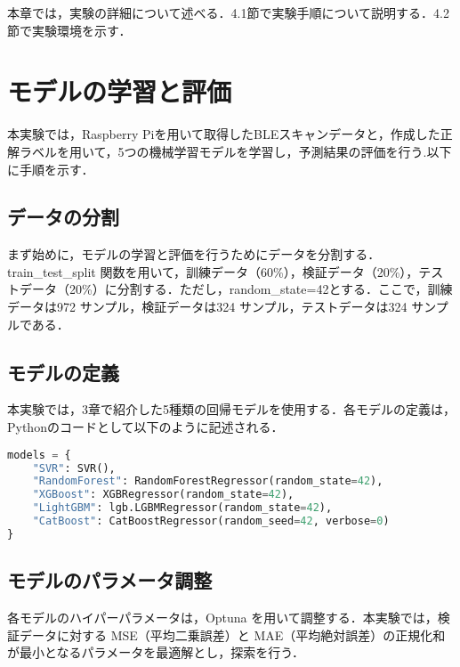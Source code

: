 本章では，実験の詳細について述べる．4.1節で実験手順について説明する．4.2節で実験環境を示す．

\section{モデルの学習と評価}
本実験では，Raspberry Piを用いて取得したBLEスキャンデータと，作成した正解ラベルを用いて，5つの機械学習モデルを学習し，予測結果の評価を行う.以下に手順を示す．

\subsection{データの分割}
まず始めに，モデルの学習と評価を行うためにデータを分割する．train\_test\_split 関数を用いて，訓練データ（60\%），検証データ（20\%），テストデータ（20\%）に分割する．ただし，random\_state=42とする．ここで，訓練データは972 サンプル，検証データは324 サンプル，テストデータは324 サンプルである．

\subsection{モデルの定義}
本実験では，3章で紹介した5種類の回帰モデルを使用する．各モデルの定義は，Pythonのコードとして以下のように記述される．
\begin{lstlisting}[style=mystyle, language=Python, caption=回帰モデルの定義, label={models}]
models = {
    "SVR": SVR(),
    "RandomForest": RandomForestRegressor(random_state=42),
    "XGBoost": XGBRegressor(random_state=42),
    "LightGBM": lgb.LGBMRegressor(random_state=42),
    "CatBoost": CatBoostRegressor(random_seed=42, verbose=0)
}
\end{lstlisting}

\subsection{モデルのパラメータ調整}
各モデルのハイパーパラメータは，Optuna を用いて調整する．本実験では，検証データに対する MSE（平均二乗誤差）と MAE（平均絶対誤差）の正規化和が最小となるパラメータを最適解とし，探索を行う．

